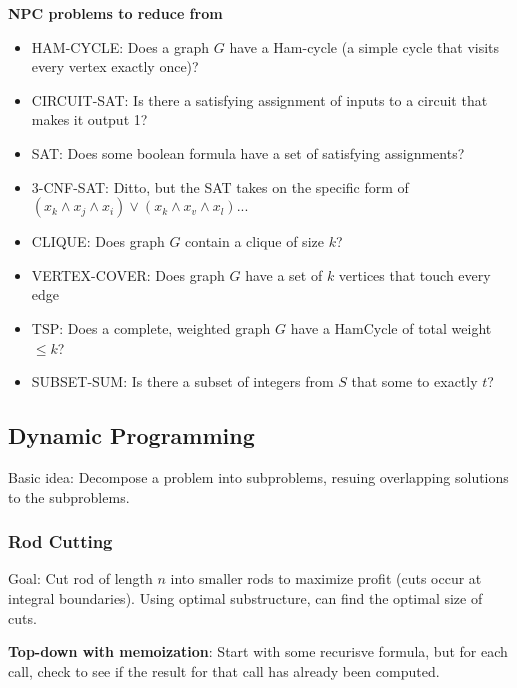 \documentclass[7pt]{article}
\begin{document}
\begin{multicols*}{4}
{\bf NPC problems to reduce from}
\begin{itemize}
\item HAM-CYCLE: Does a graph $G$ have a Ham-cycle (a simple cycle
  that visits every vertex exactly once)?
\item CIRCUIT-SAT: Is there a satisfying assignment of inputs to a
  circuit that makes it output 1?
\item SAT: Does some boolean formula have a set of satisfying assignments?
\item 3-CNF-SAT: Ditto, but the SAT takes on the specific form of
  $(x_k \wedge x_j \wedge x_i) \vee (x_k \wedge x_v \wedge x_l) ...$
\item CLIQUE: Does graph $G$ contain a clique of size $k$?
\item VERTEX-COVER: Does graph $G$ have a set of $k$ vertices that
  touch every edge
\item TSP: Does a complete, weighted graph $G$ have a HamCycle of
  total weight $\leq k$?
\item SUBSET-SUM: Is there a subset of integers from $S$ that some to
  exactly $t$? 
\end{itemize}

\subsection*{Dynamic Programming}
Basic idea: Decompose a problem into subproblems, resuing overlapping
solutions to the subproblems.

\subsubsection*{Rod Cutting}
Goal: Cut rod of length $n$ into smaller rods to maximize profit (cuts
occur at integral boundaries).  Using optimal substructure, can find
the optimal size of cuts.

{\bf Top-down with memoization}: Start with some recurisve formula, but
for each call, check to see if the result for that call has already
been computed.
\end{multicols*}
\end{document}
